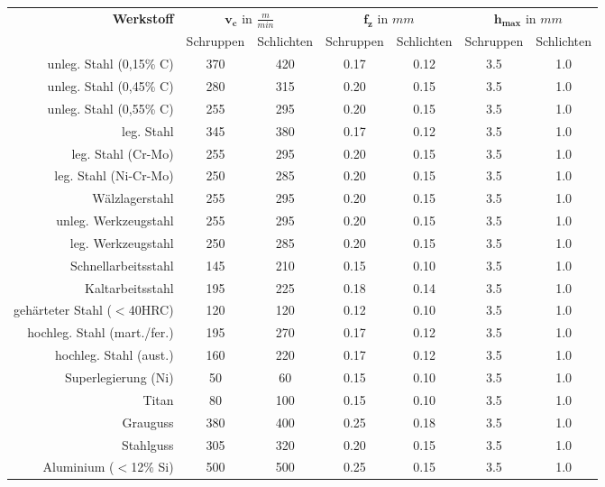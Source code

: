 \documentclass{\basedir/fablab-document}
\newcommand{\mcc}[1]{\multicolumn{2}{c}{#1}}
\begin{document}
\begin{table}
\setlength{\tabcolsep}{0.5em}
\begin{tabular}{rcccccc}
  \textbf{Werkstoff}  & \mcc{$\mathbf{v_c} \textrm{ in } \frac{m}{min} $} & \mcc{$\mathbf{f_z} \textrm{ in } mm$} & \mcc{$\mathbf{h_{max}} \textrm{ in } mm$} \\ \addlinespace \toprule
															& Schruppen 	& Schlichten 	& Schruppen 	& Schlichten 	& Schruppen 	& Schlichten		\\ \toprule
  unleg. Stahl (0,15\% C)			& 370 	& 420  	& 0.17 	& 0.12	& 3.5 	& 1.0 	\\
  unleg. Stahl (0,45\% C)			& 280 	& 315  	& 0.20 	& 0.15	& 3.5 	& 1.0 	\\
  unleg. Stahl (0,55\% C)			& 255 	& 295  	& 0.20 	& 0.15	& 3.5 	& 1.0 	\\
	leg. Stahl									& 345 	& 380  	& 0.17 	& 0.12	& 3.5 	& 1.0 	\\
	leg. Stahl (Cr-Mo)					& 255 	& 295  	& 0.20 	& 0.15	& 3.5 	& 1.0 	\\	
	leg. Stahl (Ni-Cr-Mo)				& 250 	& 285  	& 0.20 	& 0.15	& 3.5 	& 1.0 	\\
	Wälzlagerstahl							& 255 	& 295  	& 0.20 	& 0.15	& 3.5 	& 1.0 	\\
	unleg. Werkzeugstahl				& 255 	& 295  	& 0.20 	& 0.15	& 3.5 	& 1.0 	\\	
	leg. Werkzeugstahl					& 250 	& 285  	& 0.20 	& 0.15	& 3.5 	& 1.0 	\\	
	Schnellarbeitsstahl					& 145 	& 210  	& 0.15 	& 0.10	& 3.5 	& 1.0 	\\	
	Kaltarbeitsstahl						& 195 	& 225  	& 0.18 	& 0.14	& 3.5 	& 1.0 	\\	
	gehärteter Stahl ($<$40HRC)	& 120 	& 120  	& 0.12 	& 0.10	& 3.5 	& 1.0 	\\	
	hochleg. Stahl	(mart./fer.)& 195 	& 270  	& 0.17 	& 0.12	& 3.5 	& 1.0 	\\
	hochleg. Stahl	(aust.)			& 160 	& 220  	& 0.17 	& 0.12	& 3.5 	& 1.0 	\\
	Superlegierung (Ni)					& 50	 	& 60  	& 0.15 	& 0.10	& 3.5 	& 1.0 	\\
	Titan												& 80	 	& 100  	& 0.15 	& 0.10	& 3.5 	& 1.0 	\\
	Grauguss										& 380	 	& 400  	& 0.25 	& 0.18	& 3.5 	& 1.0 	\\
	Stahlguss										& 305	 	& 320  	& 0.20 	& 0.15	& 3.5 	& 1.0 	\\
	Aluminium	($<$12\% Si)			& 500	 	& 500  	& 0.25 	& 0.15	& 3.5 	& 1.0 	\\

\end{tabular}
\end{table}
\end{document}
